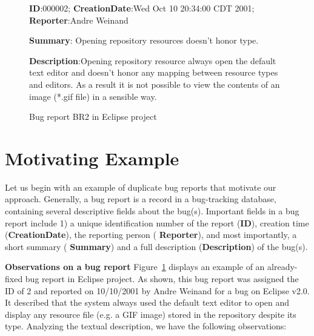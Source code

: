 \begin{figure}[t]
\sf
\small
\textbf{ID}:000002; \textbf{CreationDate}:Wed Oct 10 20:34:00 CDT 2001; \textbf{Reporter}:Andre Weinand

\textbf{Summary}: Opening repository resources doesn't honor type.

\textbf{Description}:Opening repository resource always open the default text editor and doesn't honor any mapping between resource types and editors. As a result it is not possible to view the contents of an image (*.gif file) in a sensible way.
\rm
\caption{Bug report BR2 in Eclipse project}
\label{fig:br1}
\end{figure}



\section{Motivating Example}
\label{sec:example}

Let us begin with an example of duplicate bug reports that
motivate our approach. Generally, a bug report is a record in a
bug-tracking database, containing several descriptive fields about the
bug(s). Important fields in a bug report include 1) a unique
identification number of the report (\textbf{\sf ID}), creation
time (\textbf{\sf CreationDate}), the reporting person (\textbf{\sf
Reporter}), and most importantly, a short summary (\textbf{\sf
Summary}) and a full description (\textbf{\sf Description}) of the
bug(s).

\vspace{0.05in}\noindent\textbf{Observations on a bug report}
Figure~\ref{fig:br1} displays an example of an already-fixed bug
report in Eclipse project. As shown, this bug report was assigned the
ID of 2 and reported on 10/10/2001 by Andre Weinand for a bug on
Eclipse v2.0. It described that the system always used the default
text editor to open and display any resource file (e.g. a GIF image)
stored in the repository despite its type. Analyzing the textual
description, we have the following observations:


